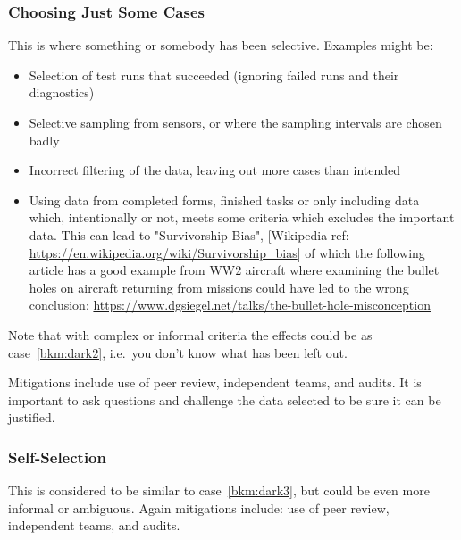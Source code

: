 \subsubsection{Choosing Just Some Cases}\label{bkm:dark3}
This is where something or somebody has been selective. Examples might be:
\begin{itemize}
\item Selection of test runs that succeeded (ignoring failed runs and their diagnostics) 
  \item Selective sampling from sensors, or where the sampling intervals are chosen badly
  \item Incorrect filtering of the data, leaving out more cases than intended
  \item Using data from completed forms, finished tasks or only including data which,
    intentionally or not, meets some criteria which excludes the important data.
    This can lead to "Survivorship Bias",
    [Wikipedia ref:
      \href{https://en.wikipedia.org/wiki/Survivorship\_bias}
           {https://en.wikipedia.org/wiki/Survivorship\_bias}]
    of which the following article has a good example from WW2 aircraft where examining the bullet
    holes on aircraft returning from missions could have led to the wrong conclusion:
    \href{https://www.dgsiegel.net/talks/the-bullet-hole-misconception}
         {https://www.dgsiegel.net/talks/the-bullet-hole-misconception}
\end{itemize}
Note that with complex or informal criteria the effects could be as case~\ref{bkm:dark2}, i.e.\ you don’t know what has been left out.

Mitigations include use of peer review, independent teams, and audits. It is important to ask questions and challenge the data selected to be sure it can be justified.

\subsubsection{Self-Selection}\label{bkm:dark4}
This is considered to be similar to case~\ref{bkm:dark3}, but could be even more informal or ambiguous. Again mitigations include: use of peer review, independent teams, and audits.


